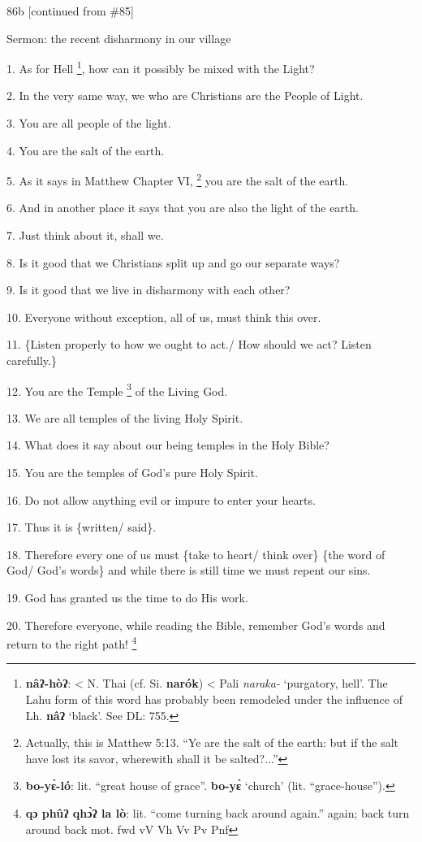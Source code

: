 
86b [continued from \#85]

Sermon: the recent disharmony in our village

1. As for Hell \footnote{\textbf{nâʔ-hòʔ}: < N. Thai (cf. Si. \textbf{narók}) < Pali \textit{naraka-} `purgatory, hell'. The Lahu form of this word has probably been remodeled under the influence of Lh. \textbf{nâʔ} `black'. See DL: 755.}, how can it possibly be mixed with the Light?

2. In the very same way, we who are Christians are the People of Light.

3. You are all people of the light.

4. You are the salt of the earth.

5. As it says in Matthew Chapter VI, \footnote{Actually, this is Matthew 5:13. ``Ye are the salt of the earth: but if the salt have lost its savor, wherewith shall it be salted?...''} you are the salt of the earth.

6. And in another place it says that you are also the light of the earth.

7. Just think about it, shall we.

8. Is it good that we Christians split up and go our separate ways?

9. Is it good that we live in disharmony with each other?

10. Everyone without exception, all of us, must think this over.

11. \{Listen properly to how we ought to act./ How should we act? Listen carefully.\}

12. You are the Temple \footnote{\textbf{bo-yɛ̀-ló}: lit. ``great house of grace''. \textbf{bo-yɛ̀} `church' (lit. ``grace-house'').} of the Living God.

13. We are all temples of the living Holy Spirit.

14. What does it say about our being temples in the Holy Bible?

15. You are the temples of God's pure Holy Spirit.

16. Do not allow anything evil or impure to enter your hearts.

17. Thus it is \{written/ said\}.

18. Therefore every one of us must \{take to heart/ think over\} \{the word of
God/ God's words\} and while there is still time we must repent our sins.

19. God has granted us the time to do His work.

20. Therefore everyone, while reading the Bible, remember God's words and return
to the right path! \footnote{\textbf{qɔ   phûʔ   qhɔ̀ʔ  la  lò}: lit. ``come turning back around again.''  again; back turn around back mot. fwd  vV  Vh  Vv Pv Pnf}

